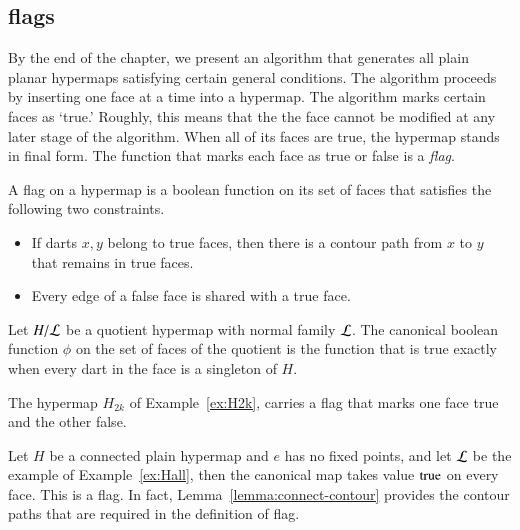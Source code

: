 \subsection{flags}

By the end of the chapter, we present an algorithm that
generates all plain planar hypermaps satisfying certain general
conditions.   The algorithm  proceeds by inserting one face
at a time into a hypermap.  
The algorithm  marks certain faces as `true.'
Roughly, this  means that the the face cannot be modified
at any later stage of the algorithm.   When all of its faces
are true, the hypermap stands in final form.
The function that marks each face as true or false is a
{\it flag}.


\begin{definition}  A flag on a hypermap
is a boolean function on its set of faces 
that satisfies the following two
constraints.
\begin{itemize}
    \item If darts $x,y$ belong to true faces,
    then there is a contour path from $x$ to $y$ that remains
    in true faces.
    \item Every edge of a false face is shared with a true face.
    \end{itemize}
\end{definition}

\begin{example} Let $H/{\cal L}$ be a quotient hypermap with
normal family $\cal L$.  The canonical boolean function
$\phi$ on the set of faces of the quotient is the function that
is true exactly when every dart in
the face is a singleton of $H$.
\end{example}

\begin{example} The hypermap $H_{2k}$ of Example~\ref{ex:H2k}, 
carries a flag
that marks one face true and the other false.
\end{example}

\begin{example} Let 
$H$ be a connected plain hypermap and $e$ has no fixed points,
and let $\cal L$ be the example of Example~\ref{ex:Hall}, 
then the canonical
map takes value ${\operatorname{true}}$ on every face.  This is a flag.
In fact,
Lemma~\ref{lemma:connect-contour} provides the contour paths 
that are required in the definition of flag.
\end{example}

